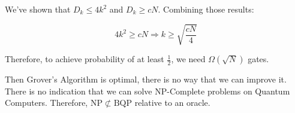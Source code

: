 We've shown that $D_k \leq 4k^2$ and $D_k \geq cN$. Combining those results:

\begin{equation}
    4 k^2 \geq cN \Rightarrow k \geq \sqrt{\frac{cN}{4}}
\end{equation}

Therefore, to achieve probability of at least $\frac{1}{2}$, we need $\Omega(\sqrt{N})$ gates. \qedsymbol

Then Grover's Algorithm is optimal, there is no way that we can improve it. There is no indication that we can solve NP-Complete problems on Quantum Computers. Therefore, $\mathrm{NP} \not\subset \mathrm{BQP}$ relative to an oracle.
